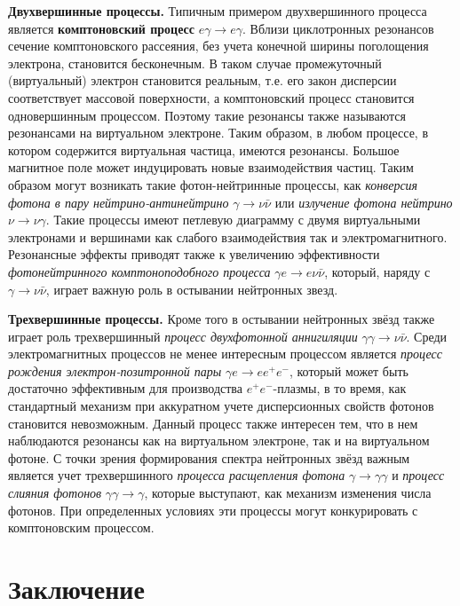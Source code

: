 \documentclass[12pt]{article}
\begin{document}
{\bf Двухвершинные процессы.} Типичным примером двухвершинного процесса является {\bfseries комптоновский процесс}  $e \gamma \to e\gamma$. Вблизи циклотронных резонансов сечение комптоновского рассеяния, без учета конечной ширины поголощения электрона, становится бесконечным. В таком случае промежуточный (виртуальный) электрон становится реальным, т.е. его закон дисперсии соответствует массовой поверхности, а комптоновский процесс становится одновершинным процессом. Поэтому такие резонансы также называются резонансами на виртуальном электроне. Таким образом, в любом процессе, в котором содержится виртуальная частица, имеются резонансы. Большое магнитное поле может индуцировать новые взаимодействия частиц. Таким образом могут возникать такие фотон-нейтринные процессы, как \textit{конверсия фотона в пару нейтрино-антинейтрино} $\gamma \to \nu \bar{\nu}$ или \textit{излучение фотона нейтрино} $\nu \to \nu \gamma$. Такие процессы имеют петлевую диаграмму с двумя виртуальными электронами и вершинами как слабого взаимодействия так и электромагнитного. Резонансные эффекты приводят также к увеличению эффективности \textit{фотонейтринного комптоноподобного процесса} $\gamma e \to e\nu \bar{\nu}$, который, наряду с $\gamma \to \nu \bar{\nu}$, играет важную роль в остывании нейтронных звезд.
		
{\bf Трехвершинные процессы.} Кроме того в остывании нейтронных звёзд также играет роль трехвершинный	\textit{процесс двухфотонной аннигиляции} $\gamma\gamma\to\nu \bar{\nu}$. Среди электромагнитных процессов не менее интересным процессом является
		\textit{процесс рождения электрон-позитронной пары} $\gamma e \to e e^+e^-$, который может быть достаточно эффективным для производства $e^+e^-$-плазмы, в то время, как стандартный механизм при аккуратном учете дисперсионных свойств фотонов становится невозможным. Данный процесс также интересен тем, что в нем наблюдаются резонансы как на виртуальном электроне, так и на виртуальном фотоне. С точки зрения формирования спектра нейтронных звёзд важным является учет трехвершинного \textit{процесса расщепления фотона} $\gamma \to \gamma \gamma$ и \textit{процесс слияния фотонов} $\gamma \gamma \to \gamma$, которые выступают, как механизм изменения числа фотонов. При определенных условиях эти процессы могут конкурировать с комптоновским процессом.  \\
	
\section{Заключение}
\newpage


\end{document}
